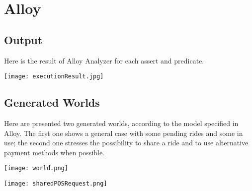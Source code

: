 \pagebreak
\section{Alloy}


\pagebreak
\subsection{Output}
Here is the result of Alloy Analyzer for each assert and predicate.

\vfill
\texttt{[image: executionResult.jpg]}
\vfill

\pagebreak
\subsection{Generated Worlds}
Here are presented two generated worlds, according to the model specified in Alloy. The first one shows a general case with some pending rides and some in use; the second one stresses the possibility to share a ride and to use alternative payment methods when possible.

\centerline{\texttt{[image: world.png]}}

\pagebreak
\centerline{\texttt{[image: sharedPOSRequest.png]}}

